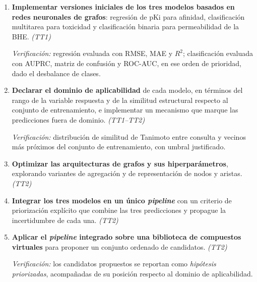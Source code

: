 \begin{enumerate}
        \textit{Verificación:} desempeño reportado con intervalos de confianza
        sobre la partición por \textit{scaffold}. Si la línea base supera a la
        GNN, ese resultado se reporta como hallazgo legítimo.

  \item \textbf{Implementar versiones iniciales de los tres modelos basados en
        redes neuronales de grafos}: regresión de pKi para afinidad,
        clasificación multitarea para toxicidad y clasificación binaria para
        permeabilidad de la BHE. \hfill \textit{(TT1)}

        \textit{Verificación:} regresión evaluada con RMSE, MAE y
        $R^2$; clasificación evaluada con AUPRC, matriz de confusión y
        ROC-AUC, en ese orden de prioridad, dado el desbalance de clases.

  \item \textbf{Declarar el dominio de aplicabilidad} de cada modelo, en
        términos del rango de la variable respuesta y de la similitud
        estructural respecto al conjunto de entrenamiento, e implementar un
        mecanismo que marque las predicciones fuera de dominio.
        \hfill \textit{(TT1--TT2)}

        \textit{Verificación:} distribución de similitud de Tanimoto entre
        consulta y vecinos más próximos del conjunto de entrenamiento, con
        umbral justificado.

  \item \textbf{Optimizar las arquitecturas de grafos y sus hiperparámetros},
        explorando variantes de agregación y de representación de nodos y
        aristas. \hfill \textit{(TT2)}

  \item \textbf{Integrar los tres modelos en un único \textit{pipeline}} con un
        criterio de priorización explícito que combine las tres predicciones y
        propague la incertidumbre de cada una. \hfill \textit{(TT2)}

  \item \textbf{Aplicar el \textit{pipeline} integrado sobre una biblioteca de
        compuestos virtuales} para proponer un conjunto ordenado de candidatos.
        \hfill \textit{(TT2)}

        \textit{Verificación:} los candidatos propuestos se reportan como
        \emph{hipótesis priorizadas}, acompañadas de su posición respecto al
        dominio de aplicabilidad. 

\end{enumerate}


